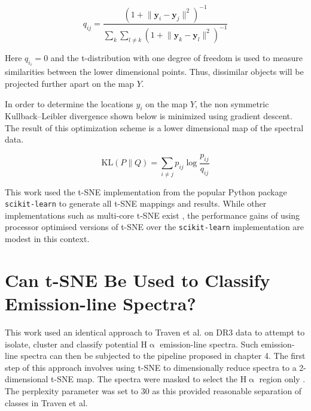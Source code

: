 \begin{equation}
    q_{ij}={\frac {(1+\lVert \mathbf {y} _{i}-\mathbf {y} _{j}\rVert ^{2})^{-1}}{\sum _{k}\sum _{l\neq k}(1+\lVert \mathbf {y} _{k}-\mathbf {y} _{l}\rVert ^{2})^{-1}}}
\end{equation}

Here $q_i_i=0$ and the t-distribution with one degree of freedom is used to measure similarities between the lower dimensional points. Thus, dissimilar objects will be projected further apart on the map $Y$.

In order to determine the locations $y_i$ on the map $Y$, the non symmetric Kullback–Leibler divergence shown below is minimized using gradient descent. The result of this optimization scheme is a lower dimensional map of the spectral data.

\begin{equation}
    \mathrm {KL} \left(P\parallel Q\right)=\sum _{i\neq j}p_{ij}\log {\frac {p_{ij}}{q_{ij}}}
\end{equation}

This work used the t-SNE implementation from the popular Python package \texttt{scikit-learn} to generate all t-SNE mappings and results. While other implementations such as multi-core t-SNE exist \cite{Ulyanov2016}, the performance gains of using processor optimised versions of t-SNE over the \texttt{scikit-learn} implementation are modest in this context.

\section{Can t-SNE Be Used to Classify Emission-line Spectra?}

This work used an identical approach to Traven et al. on DR3 data to attempt to isolate, cluster and classify potential H$\upalpha$ emission-line spectra. Such emission-line spectra can then be subjected to the pipeline proposed in chapter 4. The first step of this approach involves using t-SNE to dimensionally reduce spectra to a 2-dimensional t-SNE map. The spectra were masked to select the H$\upalpha$ region only \cite{traven2017galah}. The perplexity parameter was set to 30 as this provided reasonable separation of classes in Traven et al.

